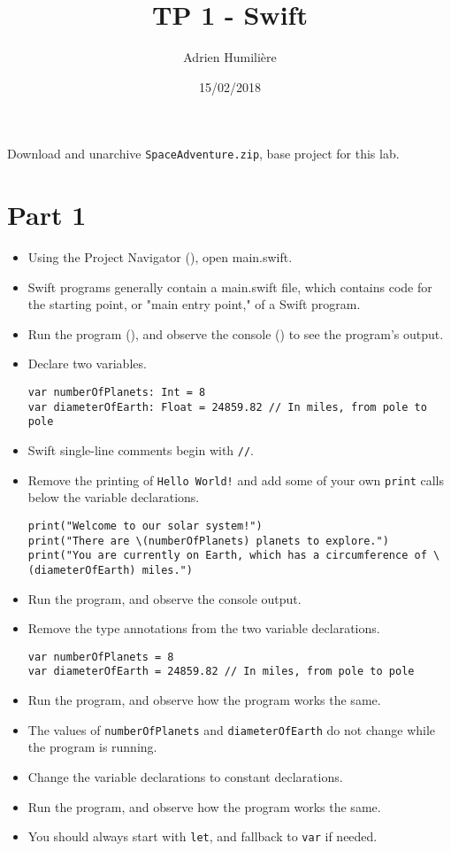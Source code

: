 \documentclass[a4paper,11pt]{scrartcl}
\begin{document}
\newcommand{\mytitle}{TP 1 - Swift}
\title{\mytitle}
\author{Adrien Humilière}
\date{15/02/2018}

\maketitle

Download and unarchive \texttt{SpaceAdventure.zip}, base project for this lab.

\section*{Part 1}

\begin{itemize}
\item Using the Project Navigator (), open main.swift.
\item Swift programs generally contain a main.swift file, which contains code for the starting point, or "main entry point," of a Swift program.
\item Run the program (), and observe the console () to see the program's output.
\item Declare two variables.
\begin{lstlisting}
var numberOfPlanets: Int = 8
var diameterOfEarth: Float = 24859.82 // In miles, from pole to pole
\end{lstlisting}
\item Swift single-line comments begin with \texttt{//}.
\item Remove the printing of \texttt{Hello World!} and add some of your own \texttt{print} calls below the variable declarations.
\begin{lstlisting}
print("Welcome to our solar system!")
print("There are \(numberOfPlanets) planets to explore.")
print("You are currently on Earth, which has a circumference of \(diameterOfEarth) miles.")
\end{lstlisting}
\item Run the program, and observe the console output.
\item Remove the type annotations from the two variable declarations.
\begin{lstlisting}
var numberOfPlanets = 8
var diameterOfEarth = 24859.82 // In miles, from pole to pole
\end{lstlisting}
\item Run the program, and observe how the program works the same.
\item The values of \texttt{numberOfPlanets} and \texttt{diameterOfEarth} do not change while the program is running.
\item Change the variable declarations to constant declarations.
\item Run the program, and observe how the program works the same.
\item You should always start with \texttt{let}, and fallback to \texttt{var} if needed.
\end{itemize}
\end{document}
